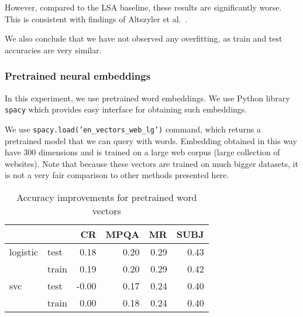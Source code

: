    However, compared to the LSA baseline, these results are significantly worse. 
    This is consistent with findings of Altszyler et al.~\cite{altszyler2016comparative}.
    
    We also conclude that we have not observed any overfitting, as train and test accuracies are very similar.
    

    \subsubsection{Pretrained neural embeddings}    
    
    In this experiment, we use pretrained word embeddings. 
    We use Python library \texttt{spacy} which provides easy interface for obtaining such embeddings.
    
    We use \texttt{spacy.load('en\_vectors\_web\_lg')} command, which returns a pretrained model that we can query with words. 
    Embedding obtained in this way have $300$ dimensions and is trained on a large web corpus (large collection of websites). 
    Note that because these vectors are trained on much bigger datasets, it is not a very fair comparison to other methods presented here.

    \begin{table}[h]
    \begin{center}
    
    \begin{tabular}{llrrrr}
    \toprule
     &&CR &MPQA &MR &SUBJ \\
    \midrule
    logistic & test & 0.18 & 0.20 & 0.29 & 0.43 \\
     & train & 0.19 & 0.20 & 0.29 & 0.42 \\
    svc & test &-0.00 & 0.17 & 0.24 & 0.40 \\
     & train & 0.00 & 0.18 & 0.24 & 0.40 \\
    \bottomrule
    \end{tabular}
    
    \caption[Accuracy improvements for pretrained word vectors]{Accuracy improvements for pretrained word vectors}
    \label{tab:res:pretrainedwordvec}
    \end{center}
    \end{table}
    
